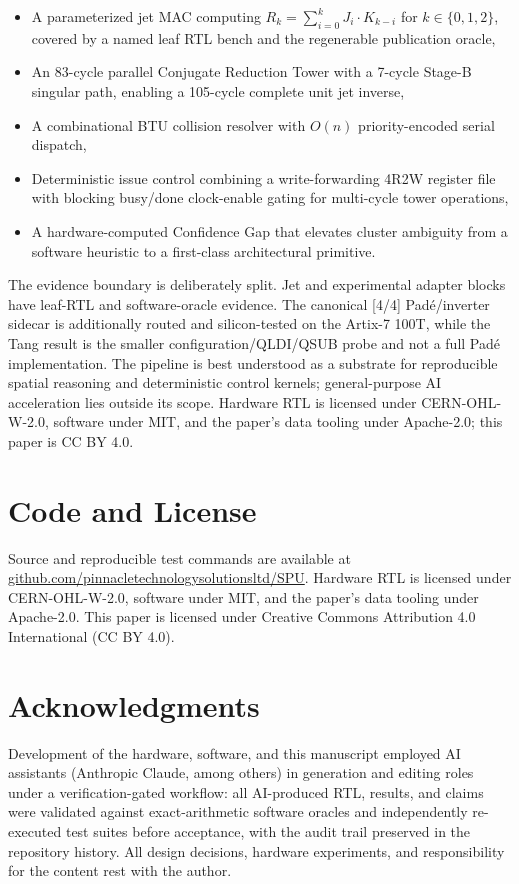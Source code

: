 \documentclass[conference]{IEEEtran}
\begin{document}
\begin{itemize}
\item A parameterized jet MAC computing $R_k = \sum_{i=0}^{k} J_i \cdot
K_{k-i}$ for $k \in \{0,1,2\}$, covered by a named leaf RTL bench and
the regenerable publication oracle,
\item An 83-cycle parallel Conjugate Reduction Tower with a 7-cycle
Stage-B singular path, enabling a 105-cycle complete unit jet inverse,
\item A combinational BTU collision resolver with $O(n)$ priority-encoded
serial dispatch,
\item Deterministic issue control combining a write-forwarding 4R2W
register file with blocking busy/done clock-enable gating for multi-cycle
tower operations,
\item A hardware-computed Confidence Gap that elevates cluster ambiguity
from a software heuristic to a first-class architectural primitive.
\end{itemize}

The evidence boundary is deliberately split. Jet and experimental adapter
blocks have leaf-RTL and software-oracle evidence. The canonical [4/4]
Pad\'{e}/inverter sidecar is additionally routed and silicon-tested on the
Artix-7 100T, while the Tang result is the smaller configuration/QLDI/QSUB
probe and not a full Pad\'{e} implementation. The pipeline is best understood
as a substrate for reproducible spatial reasoning and deterministic control
kernels; general-purpose AI acceleration lies outside its scope. Hardware RTL
is licensed under CERN-OHL-W-2.0, software under MIT, and the paper's data
tooling under Apache-2.0; this paper is CC BY 4.0.

\section*{Code and License}
Source and reproducible test commands are available at
\url{github.com/pinnacletechnologysolutionsltd/SPU}. Hardware RTL is licensed
under CERN-OHL-W-2.0, software under MIT, and the paper's data tooling under
Apache-2.0. This paper is licensed under Creative Commons Attribution 4.0
International (CC BY 4.0).

\section*{Acknowledgments}
Development of the hardware, software, and this manuscript employed AI
assistants (Anthropic Claude, among others) in generation and editing roles
under a verification-gated workflow: all AI-produced RTL, results, and claims
were validated against exact-arithmetic software oracles and independently
re-executed test suites before acceptance, with the audit trail preserved in
the repository history. All design decisions, hardware experiments, and
responsibility for the content rest with the author.
\end{document}
